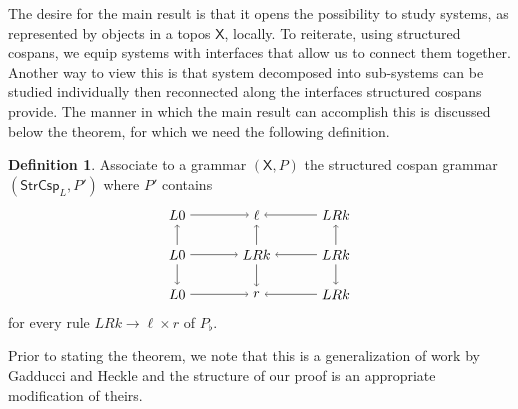 \documentclass{amsart}
\newcommand{\X}{\cat{X}}
\newcommand{\StrCsp}{\cat{StrCsp}}
\newcommand{\cat}[1]{\mathsf{#1}}
\theoremstyle{remark}
\theoremstyle{definition}
\newtheorem{definition}[theorem]{Definition}
\begin{document}
The desire for the main result is that it opens the possibility to
study systems, as represented by objects in a topos $ \X $,
locally. To reiterate, using structured cospans, we equip systems with
interfaces that allow us to connect them together. Another way
to view this is that system decomposed into
sub-systems can be studied individually then reconnected along
the interfaces structured cospans provide. The manner in which the main
result can accomplish this is discussed below the theorem, for which
we need the following definition.

\begin{definition}
  Associate to a grammar $ ( \X , P ) $ the structured cospan grammar
  $ ( \StrCsp_L , P' ) $ where $ P' $ contains
%
  \[
    \begin{tikzpicture}
      \node (1) at (0,2) {$ L 0 $}; \node (2) at (2,2) {$ \ell
        $}; \node (3) at (4,2) {$ LRk $}; \node (4) at (0,1)
      {$ L 0 $}; \node (5) at (2,1) {$ LRk $}; \node (6) at (4,1)
      {$ LRk $}; \node (7) at (0,0) {$ L 0 $}; \node (8) at (2,0)
      {$ r $}; \node (9) at (4,0) {$ LRk
        $}; \draw [->] (1) to node [] {\scriptsize{$
          $}} (2); \draw [->] (3) to node [] {\scriptsize{$
          $}} (2); \draw [->] (4) to node [] {\scriptsize{$
          $}} (5); \draw [->] (6) to node [] {\scriptsize{$
          $}} (5); \draw [->] (7) to node [] {\scriptsize{$
          $}} (8); \draw [->] (9) to node [] {\scriptsize{$
          $}} (8); \draw [->] (4) to node [] {\scriptsize{$
          $}} (1); \draw [->] (4) to node [] {\scriptsize{$
          $}} (7); \draw [->] (5) to node [] {\scriptsize{$
          $}} (2); \draw [->] (5) to node [] {\scriptsize{$
          $}} (8); \draw [->] (6) to node [] {\scriptsize{$
          $}} (3); \draw [->] (6) to node [] {\scriptsize{$ $}} (9);
    \end{tikzpicture}
  \]
% 
  for every rule $ LRk \to \ell \times r $ of $ P_{\flat} $.
\end{definition}

Prior to stating the theorem, we note that this is a generalization of
work by Gadducci and Heckle \cite{Gadd_IndGraphTrans} and the
structure of our proof is an appropriate modification of theirs.
\end{document}
